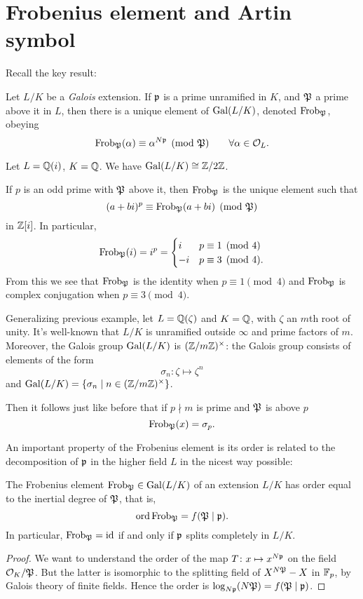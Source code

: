 \section{Frobenius element and Artin symbol}
Recall the key result:
\begin{theorem}
	Let $L/K$ be a \emph{Galois} extension.
	If $\mathfrak p$ is a prime unramified in $K$, and $\mathfrak P$ a prime above it in $L$,
	then there is a unique element of $\operatorname{Gal}(L/K)$, denoted $\mathrm{Frob}_\mathfrak P$, obeying
	\[ \mathrm{Frob}_\mathfrak P(\alpha) \equiv \alpha^{N\mathfrak p} \pmod{\mathfrak P}
		\qquad \forall \alpha \in \mathcal O_L. \]
\end{theorem}
\begin{example}
	Let $L = \mathbb Q(i)$, $K = \mathbb Q$.
	We have $\operatorname{Gal}(L/K) \cong \mathbb Z/2\mathbb Z$.

	If $p$ is an odd prime with $\mathfrak P$ above it,
	then $\mathrm{Frob}_\mathfrak P$ is the unique element such that
	\[ (a+bi)^p \equiv \mathrm{Frob}_\mathfrak P(a+bi) \pmod{\mathfrak P} \]
	in $\mathbb Z[i]$. In particular,
	\[ \mathrm{Frob}_\mathfrak P(i) = i^p =
		\begin{cases}
			i & p \equiv 1 \pmod 4 \\
			-i & p \equiv 3 \pmod 4.
		\end{cases}
	\]
	From this we see that $\mathrm{Frob}_\mathfrak P$ is the identity when $p \equiv 1 \pmod 4$
	and $\mathrm{Frob}_\mathfrak P$ is complex conjugation when $p \equiv 3 \pmod 4$.
\end{example}
\begin{example}
	Generalizing previous example, let $L = \mathbb Q(\zeta)$ and $K = \mathbb Q$,
	with $\zeta$ an $m$th root of unity.
	It's well-known that $L/K$ is unramified outside $\infty$
	and prime factors of $m$.
	Moreover, the Galois group $\operatorname{Gal}(L/K)$ is $(\mathbb Z/m\mathbb Z)^\times$:
	the Galois group consists of elements of the form
	\[ \sigma_n \colon \zeta \mapsto \zeta^n \]
	and $\operatorname{Gal}(L/K) = \left\{ \sigma_n \mid n \in (\mathbb Z/m\mathbb Z)^\times \right\}$.

	Then it follows just like before that
	if $p \nmid m$ is prime and $\mathfrak P$ is above $p$
	\[ \mathrm{Frob}_\mathfrak P(x) = \sigma_p. \]
\end{example}

An important property of the Frobenius element is its order
is related to the decomposition of $\mathfrak p$ in the higher field $L$
in the nicest way possible:
\begin{lemma}
	The Frobenius element $\mathrm{Frob}_\mathfrak P \in \operatorname{Gal}(L/K)$
	of an extension $L/K$ has order equal to the
	inertial degree of $\mathfrak P$, that is,
	\[ \operatorname{ord} \mathrm{Frob}_\mathfrak P = f(\mathfrak P \mid \mathfrak p). \]
	In particular, $\mathrm{Frob}_\mathfrak P = \mathrm{id}$ if and only if $\mathfrak p$
	splits completely in $L/K$.
\end{lemma}
\begin{proof}
	We want to understand the order of the map $T \colon x \mapsto x^{N\mathfrak p}$ on
	the field $\mathcal O_K / \mathfrak P$.
	But the latter is isomorphic to the splitting field
	of $X^{N\mathfrak P} - X$ in $\mathbb F_p$, by Galois theory of finite fields.
	Hence the order is $\log_{N\mathfrak p} (N\mathfrak P) = f(\mathfrak P \mid \mathfrak p)$.
\end{proof}

